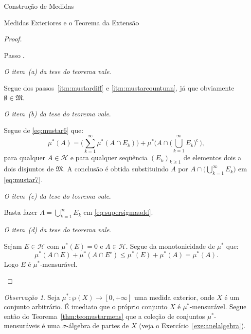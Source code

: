 \documentclass[oneside,final,11pt]{amsbook}
\newcommand{\compl}{\mathrm c}
\newcounter{contastep}
\newenvironment{stepindent}{\setcounter{contastep}{1}
\begin{list} {Passo \arabic{contastep}.}
{\usecounter{contastep}
\setlength{\leftmargin}{10pt}
\setlength{\rightmargin}{10pt}
\setlength{\labelsep}{5pt}
\setlength{\itemsep}{10pt}
\setlength{\topsep}{10pt}}}
{\end{list}}
\theoremstyle{remark}\newtheorem{exercise}{Exercício}[chapter]
\theoremstyle{remark}\newtheorem{*exercise}[exercise]{\hbox to 0pt{\hskip 0pt minus 1fil*}Exercício}
\theoremstyle{definition}\newtheorem{exdefin}{Definição}[chapter]
\theoremstyle{plain}\newtheorem{teo}{Teorema}[section]
\theoremstyle{plain}\newtheorem{lem}[teo]{Lema}
\theoremstyle{plain}\newtheorem{prop}[teo]{Proposição}
\theoremstyle{plain}\newtheorem{cor}[teo]{Corolário}
\theoremstyle{definition}\newtheorem{defin}[teo]{Definição}
\theoremstyle{remark}\newtheorem{rem}[teo]{Observação}
\theoremstyle{definition}\newtheorem{notation}[teo]{Notação}
\theoremstyle{definition}\newtheorem{convention}[teo]{Convenção}
\theoremstyle{definition}\newtheorem{example}[teo]{Exemplo}
\numberwithin{section}{chapter}
\numberwithin{equation}{section}
\begin{document}
\begin{chapter}{Construção de Medidas}
\begin{section}{Medidas Exteriores e o Teorema da Extensão}
\begin{proof}
\begin{stepindent}
\item {\em O item~(a) da tese do teorema vale}.

Segue dos passos~\ref{itm:mustardiff} e \ref{itm:mustarcountunn}, já que obviamente
$\emptyset\in\mathfrak M$.

\item {\em O item~(b) da tese do teorema vale}.

Segue de \eqref{eq:mustar6} que:
\begin{equation}\label{eq:mustar7}
\mu^*(A)=\Big(\sum_{k=1}^\infty\mu^*(A\cap E_k)\Big)+\mu^*\Big(A\cap\Big(\bigcup_{k=1}^\infty E_k\Big)^{\!\compl\,}\Big),
\end{equation}
para qualquer $A\in\mathcal H$ e para qualquer seqüência $(E_k)_{k\ge1}$ de elementos dois a dois
disjuntos de $\mathfrak M$. A conclusão é obtida substituindo $A$ por
$A\cap\big(\bigcup_{k=1}^\infty E_k\big)$ em \eqref{eq:mustar7}.

\item {\em O item~(c) da tese do teorema vale}.

Basta fazer $A=\bigcup_{k=1}^\infty E_k$ em \eqref{eq:supersigmaadd}.

\item {\em O item~(d) da tese do teorema vale}.

Sejam $E\in\mathcal H$ com $\mu^*(E)=0$ e $A\in\mathcal H$. Segue da monotonicidade
de $\mu^*$ que:
\[\mu^*(A\cap E)+\mu^*(A\cap E^\compl)\le\mu^*(E)+\mu^*(A)=\mu^*(A).\]
Logo $E$ é $\mu^*$-mensurável.\qedhere
\end{stepindent}
\end{proof}

\begin{rem}
Seja $\mu^*:\wp(X)\to[0,+\infty]$ uma medida exterior, onde $X$ é um conjunto
arbitrário. É imediato que o próprio conjunto $X$ é $\mu^*$-mensurável.
Segue então do Teorema~\ref{thm:teomustarmens} que a coleção de conjuntos
$\mu^*$-mensuráveis é uma $\sigma$-álgebra de partes de $X$ (veja o Exercício~\ref{exe:anelalgebra}).
\end{rem}


\end{section}
\end{chapter}
\end{document}
